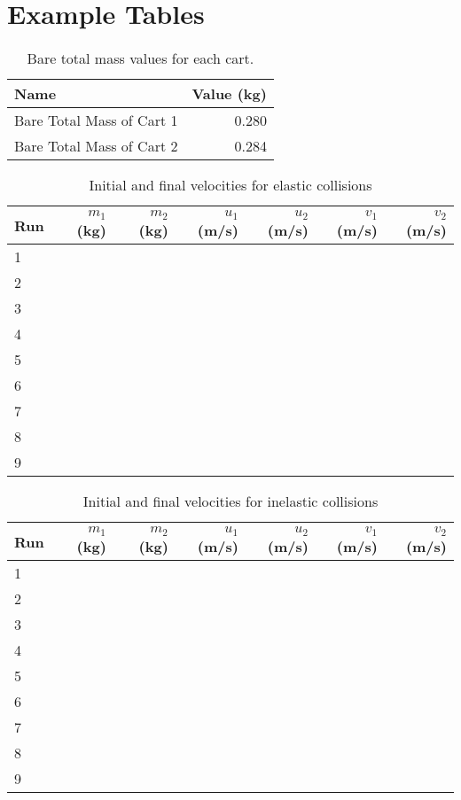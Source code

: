 \section{Example Tables}
%
\begin{table}[ht]
    \centering
    \begin{tabular}{l|r}
        \textbf{Name} & \textbf{Value} (kg) \\
        \hline
        Bare Total Mass of Cart 1 & 0.280 \\
        Bare Total Mass of Cart 2 & 0.284 \\
        \hline
    \end{tabular}
    \caption{Bare total mass values for each cart.}
    \label{09:table.mass}
\end{table}
%
\begin{table}[ht]
    \centering
    \begin{tabular}{l|r|r|r|r|r|r}
        \textbf{Run} & $m_{1}$ (kg) & $m_{2}$ (kg) & $u_{1}$ (m/s) & $u_{2}$ (m/s) & $v_{1}$ (m/s) & $v_{2}$ (m/s) \\
        \hline
        1 & & & & & & \\
        2 & & & & & & \\
        3 & & & & & & \\
        \hline
        4 & & & & & & \\
        5 & & & & & & \\
        6 & & & & & & \\
        \hline
        7 & & & & & & \\
        8 & & & & & & \\
        9 & & & & & & \\
        \hline
    \end{tabular}
    \caption{Initial and final velocities for elastic collisions}
    \label{09:table.v.elastic}
\end{table}
%
\begin{table}[ht]
    \centering
    \begin{tabular}{l|r|r|r|r|r|r}
        \textbf{Run} & $m_{1}$ (kg) & $m_{2}$ (kg) & $u_{1}$ (m/s) & $u_{2}$ (m/s) & $v_{1}$ (m/s) & $v_{2}$ (m/s) \\
        \hline
        1 & & & & & & \\
        2 & & & & & & \\
        3 & & & & & & \\
        \hline
        4 & & & & & & \\
        5 & & & & & & \\
        6 & & & & & & \\
        \hline
        7 & & & & & & \\
        8 & & & & & & \\
        9 & & & & & & \\
        \hline
    \end{tabular}
    \caption{Initial and final velocities for inelastic collisions}
    \label{09:table.v.inelastic}
\end{table}
